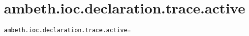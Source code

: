 \section{ambeth.ioc.declaration.trace.active}
\label{configuration:AmbethIocDeclarationTraceActive}
\ClearAPI
\TODO
{}
\begin{lstlisting}[style=Props,caption={Usage example for \textit{ambeth.ioc.declaration.trace.active}}]
ambeth.ioc.declaration.trace.active=
\end{lstlisting}